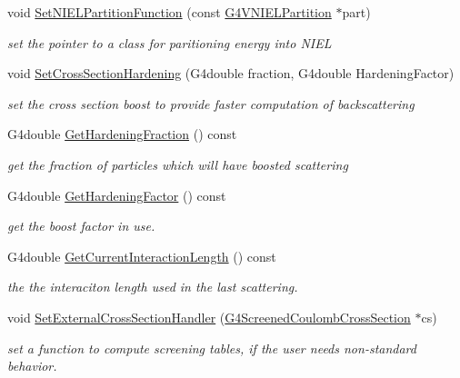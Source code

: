 \begin{DoxyCompactItemize}
void \hyperlink{classG4ScreenedNuclearRecoil_aebaeb123c972f0b1fd884b680da9ada6}{Set\+N\+I\+E\+L\+Partition\+Function} (const \hyperlink{classG4VNIELPartition}{G4\+V\+N\+I\+E\+L\+Partition} $\ast$part)
\begin{DoxyCompactList}\small\item\em set the pointer to a class for paritioning energy into N\+I\+EL \end{DoxyCompactList}\item 
void \hyperlink{classG4ScreenedNuclearRecoil_a82efdd93ae72c169ba4d137c0b1bd37f}{Set\+Cross\+Section\+Hardening} (G4double fraction, G4double Hardening\+Factor)
\begin{DoxyCompactList}\small\item\em set the cross section boost to provide faster computation of backscattering \end{DoxyCompactList}\item 
G4double \hyperlink{classG4ScreenedNuclearRecoil_a2effa40b95cec0d0323a2f40f040aaff}{Get\+Hardening\+Fraction} () const 
\begin{DoxyCompactList}\small\item\em get the fraction of particles which will have boosted scattering \end{DoxyCompactList}\item 
G4double \hyperlink{classG4ScreenedNuclearRecoil_a4aba65202fa37745d11c2b689fa36f00}{Get\+Hardening\+Factor} () const 
\begin{DoxyCompactList}\small\item\em get the boost factor in use. \end{DoxyCompactList}\item 
G4double \hyperlink{classG4ScreenedNuclearRecoil_abe7517bfaa74ef1144acc5a221cd7ffa}{Get\+Current\+Interaction\+Length} () const 
\begin{DoxyCompactList}\small\item\em the the interaciton length used in the last scattering. \end{DoxyCompactList}\item 
void \hyperlink{classG4ScreenedNuclearRecoil_aa98210f990a3b80391f6f661c17f09e5}{Set\+External\+Cross\+Section\+Handler} (\hyperlink{classG4ScreenedCoulombCrossSection}{G4\+Screened\+Coulomb\+Cross\+Section} $\ast$cs)
\begin{DoxyCompactList}\small\item\em set a function to compute screening tables, if the user needs non-\/standard behavior. \end{DoxyCompactList}\item 

\end{DoxyCompactItemize}
